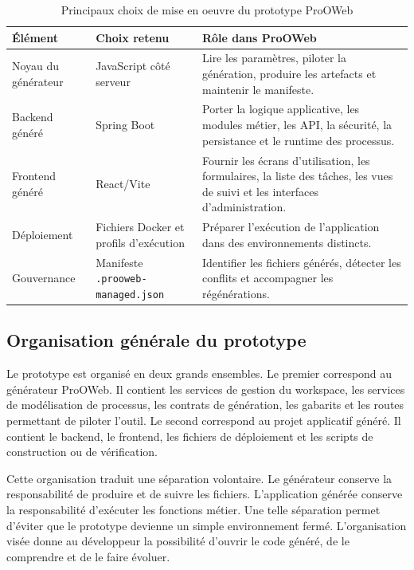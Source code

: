 \begin{table}[H]
\centering
\small
\caption{Principaux choix de mise en oeuvre du prototype ProOWeb}
\label{tab:chap4-choix-techniques}
\begin{tabular}{p{3.6cm}p{4.5cm}p{5.5cm}}
\hline
\textbf{Élément} & \textbf{Choix retenu} & \textbf{Rôle dans ProOWeb} \\
\hline
Noyau du générateur & JavaScript côté serveur & Lire les paramètres, piloter la génération, produire les artefacts et maintenir le manifeste. \\
Backend généré & Spring Boot & Porter la logique applicative, les modules métier, les API, la sécurité, la persistance et le runtime des processus. \\
Frontend généré & React/Vite & Fournir les écrans d'utilisation, les formulaires, la liste des tâches, les vues de suivi et les interfaces d'administration. \\
Déploiement & Fichiers Docker et profils d'exécution & Préparer l'exécution de l'application dans des environnements distincts. \\
Gouvernance & Manifeste \texttt{.prooweb-managed.json} & Identifier les fichiers générés, détecter les conflits et accompagner les régénérations. \\
\hline
\end{tabular}
\end{table}

\subsection{Organisation générale du prototype}

Le prototype est organisé en deux grands ensembles. Le premier correspond au générateur ProOWeb. Il contient les services de gestion du workspace, les services de modélisation de processus, les contrats de génération, les gabarits et les routes permettant de piloter l'outil. Le second correspond au projet applicatif généré. Il contient le backend, le frontend, les fichiers de déploiement et les scripts de construction ou de vérification.

Cette organisation traduit une séparation volontaire. Le générateur conserve la responsabilité de produire et de suivre les fichiers. L'application générée conserve la responsabilité d'exécuter les fonctions métier. Une telle séparation permet d'éviter que le prototype devienne un simple environnement fermé. L'organisation visée donne au développeur la possibilité d'ouvrir le code généré, de le comprendre et de le faire évoluer.


